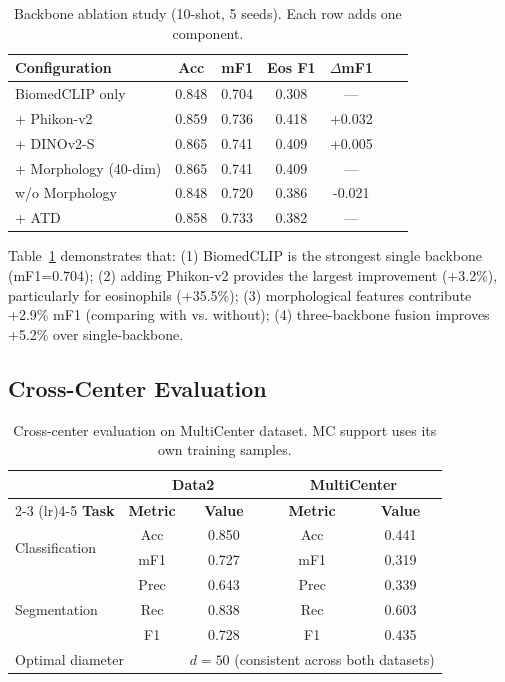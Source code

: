\documentclass[preprint,review,12pt]{elsarticle}
\begin{document}
\begin{table}[htbp]
\centering
\caption{Backbone ablation study (10-shot, 5 seeds). Each row adds one component.}
\label{tab:backbone}
\begin{tabular}{lcccccc}
\toprule
\textbf{Configuration} & \textbf{Acc} & \textbf{mF1} & \textbf{Eos F1} & $\Delta$\textbf{mF1} \\
\midrule
BiomedCLIP only & 0.848 & 0.704 & 0.308 & --- \\
+ Phikon-v2 & 0.859 & 0.736 & 0.418 & +0.032 \\
+ DINOv2-S & 0.865 & 0.741 & 0.409 & +0.005 \\
+ Morphology (40-dim) & 0.865 & 0.741 & 0.409 & --- \\
w/o Morphology & 0.848 & 0.720 & 0.386 & -0.021 \\
+ ATD & 0.858 & 0.733 & 0.382 & --- \\
\bottomrule
\end{tabular}
\end{table}

Table~\ref{tab:backbone} demonstrates that: (1) BiomedCLIP is the strongest single backbone (mF1=0.704); (2) adding Phikon-v2 provides the largest improvement (+3.2\%), particularly for eosinophils (+35.5\%); (3) morphological features contribute +2.9\% mF1 (comparing with vs. without); (4) three-backbone fusion improves +5.2\% over single-backbone.

\subsection{Cross-Center Evaluation}

\begin{table}[htbp]
\centering
\caption{Cross-center evaluation on MultiCenter dataset. MC support uses its own training samples.}
\label{tab:multicenter}
\begin{tabular}{lcccc}
\toprule
& \multicolumn{2}{c}{\textbf{Data2}} & \multicolumn{2}{c}{\textbf{MultiCenter}} \\
\cmidrule(lr){2-3} \cmidrule(lr){4-5}
\textbf{Task} & \textbf{Metric} & \textbf{Value} & \textbf{Metric} & \textbf{Value} \\
\midrule
\multirow{2}{*}{Classification} & Acc & 0.850 & Acc & 0.441 \\
& mF1 & 0.727 & mF1 & 0.319 \\
\midrule
\multirow{3}{*}{Segmentation} & Prec & 0.643 & Prec & 0.339 \\
& Rec & 0.838 & Rec & 0.603 \\
& F1 & 0.728 & F1 & 0.435 \\
\midrule
\multicolumn{2}{l}{Optimal diameter} & \multicolumn{3}{c}{$d=50$ (consistent across both datasets)} \\
\bottomrule
\end{tabular}
\end{table}
\end{document}
